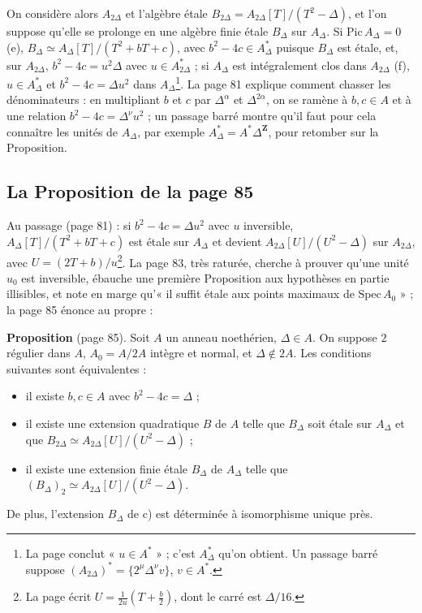 \documentclass[11pt,a4paper]{article}
\begin{document}
On considère alors $A_{2\Delta}$ et l'algèbre étale $B_{2\Delta} =
A_{2\Delta}[T]/(T^2 - \Delta)$, et l'on suppose qu'elle se prolonge en une algèbre
finie étale $B_\Delta$ sur $A_\Delta$. Si $\mathrm{Pic}\,A_\Delta = 0$ (e), $B_\Delta
\simeq A_\Delta[T]/(T^2 + bT + c)$, avec $b^2 - 4c \in A_\Delta^{*}$ puisque
$B_\Delta$ est étale, et, sur $A_{2\Delta}$, $b^2 - 4c = u^2\Delta$ avec $u \in
A_{2\Delta}^{*}$ ; si $A_\Delta$ est intégralement clos dans $A_{2\Delta}$ (f), $u
\in A_\Delta^{*}$ et $b^2 - 4c = \Delta u^2$ dans $A_\Delta$\footnote{La page conclut
« $u \in A^{*}$ » ; c'est $A_\Delta^{*}$ qu'on obtient. Un passage barré suppose
$(A_{2\Delta})^{*} = \{2^\mu\Delta^\nu v\}$, $v \in A^{*}$.}. La page 81 explique
comment chasser les dénominateurs : en multipliant $b$ et $c$ par $\Delta^\alpha$ et
$\Delta^{2\alpha}$, on se ramène à $b, c \in A$ et à une relation $b^2 - 4c =
\Delta^\nu u^2$ ; un passage barré montre qu'il faut pour cela connaître les unités
de $A_\Delta$, par exemple $A_\Delta^{*} = A^{*}\Delta^{\mathbf{Z}}$, pour retomber
sur la Proposition.

\subsection*{La Proposition de la page 85}

Au passage (page 81) : si $b^2 - 4c = \Delta u^2$ avec $u$ inversible,
$A_\Delta[T]/(T^2 + bT + c)$ est étale sur $A_\Delta$ et devient $A_{2\Delta}[U]/(U^2 -
\Delta)$ sur $A_{2\Delta}$, avec $U = (2T + b)/u$\footnote{La page écrit $U =
\frac{1}{2u}(T + \frac{b}{2})$, dont le carré est $\Delta/16$.}. La page 83, très
raturée, cherche à prouver qu'une unité $u_0$ est inversible, ébauche une première
Proposition aux hypothèses en partie illisibles, et note en marge qu'« il suffit
étale aux points maximaux de $\mathrm{Spec}\,A_0$ » ; la page 85 énonce au propre :

\textbf{Proposition} (page 85). Soit $A$ un anneau noethérien, $\Delta \in A$. On
suppose $2$ régulier dans $A$, $A_0 = A/2A$ intègre et normal, et $\Delta \notin 2A$.
Les conditions suivantes sont équivalentes :
\begin{itemize}
  \item[a)] il existe $b, c \in A$ avec $b^2 - 4c = \Delta$ ;
  \item[b)] il existe une extension quadratique $B$ de $A$ telle que $B_\Delta$ soit
    étale sur $A_\Delta$ et que $B_{2\Delta} \simeq A_{2\Delta}[U]/(U^2 - \Delta)$ ;
  \item[c)] il existe une extension finie étale $B_\Delta$ de $A_\Delta$ telle que
    $(B_\Delta)_2 \simeq A_{2\Delta}[U]/(U^2 - \Delta)$.
\end{itemize}
De plus, l'extension $B_\Delta$ de c) est déterminée à isomorphisme unique près.
\end{document}
